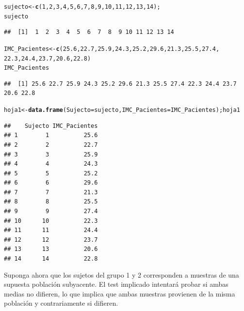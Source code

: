 \documentclass[12pt,letterpaper]{article}\usepackage[]{graphicx}\usepackage[]{color}
\makeatletter
\newcommand{\hlnum}[1]{\textcolor[rgb]{0.686,0.059,0.569}{#1}}%
\newcommand{\hlstd}[1]{\textcolor[rgb]{0.345,0.345,0.345}{#1}}%
\newcommand{\hlkwb}[1]{\textcolor[rgb]{0.69,0.353,0.396}{#1}}%
\newcommand{\hlkwc}[1]{\textcolor[rgb]{0.333,0.667,0.333}{#1}}%
\newcommand{\hlkwd}[1]{\textcolor[rgb]{0.737,0.353,0.396}{\textbf{#1}}}%
\newenvironment{kframe}{%
 \def\at@end@of@kframe{}%
 \ifinner\ifhmode%
  \def\at@end@of@kframe{\end{minipage}}%
  \begin{minipage}{\columnwidth}%
 \fi\fi%
 \def\FrameCommand##1{\hskip\@totalleftmargin \hskip-\fboxsep
 \colorbox{shadecolor}{##1}\hskip-\fboxsep
     \hskip-\linewidth \hskip-\@totalleftmargin \hskip\columnwidth}%
 \MakeFramed {\advance\hsize-\width
   \@totalleftmargin\z@ \linewidth\hsize
   \@setminipage}}%
 {\par\unskip\endMakeFramed%
 \at@end@of@kframe}
\newenvironment{knitrout}{}{} %
\makeatother
\begin{document}
\begin{knitrout}
\color{fgcolor}\begin{kframe}
\begin{alltt}
\hlstd{sujecto} \hlkwb{<-} \hlkwd{c}\hlstd{(}\hlnum{1}\hlstd{,} \hlnum{2}\hlstd{,} \hlnum{3}\hlstd{,} \hlnum{4}\hlstd{,} \hlnum{5}\hlstd{,} \hlnum{6}\hlstd{,} \hlnum{7}\hlstd{,} \hlnum{8}\hlstd{,} \hlnum{9}\hlstd{,} \hlnum{10}\hlstd{,} \hlnum{11}\hlstd{,} \hlnum{12}\hlstd{,} \hlnum{13}\hlstd{,} \hlnum{14}\hlstd{);}
\hlstd{sujecto}
\end{alltt}
\begin{verbatim}
##  [1]  1  2  3  4  5  6  7  8  9 10 11 12 13 14
\end{verbatim}
\begin{alltt}
\hlstd{IMC_Pacientes} \hlkwb{<-} \hlkwd{c}\hlstd{(}\hlnum{25.6}\hlstd{,} \hlnum{22.7}\hlstd{,} \hlnum{25.9}\hlstd{,} \hlnum{24.3}\hlstd{,} \hlnum{25.2}\hlstd{,} \hlnum{29.6}\hlstd{,} \hlnum{21.3}\hlstd{,} \hlnum{25.5}\hlstd{,} \hlnum{27.4}\hlstd{,}
                   \hlnum{22.3}\hlstd{,} \hlnum{24.4}\hlstd{,} \hlnum{23.7}\hlstd{,} \hlnum{20.6}\hlstd{,} \hlnum{22.8}\hlstd{)}
\hlstd{IMC_Pacientes}
\end{alltt}
\begin{verbatim}
##  [1] 25.6 22.7 25.9 24.3 25.2 29.6 21.3 25.5 27.4 22.3 24.4 23.7 20.6 22.8
\end{verbatim}
\begin{alltt}
\hlstd{hoja1} \hlkwb{<-} \hlkwd{data.frame}\hlstd{(}\hlkwc{Sujecto}\hlstd{=sujecto,} \hlkwc{IMC_Pacientes}\hlstd{=IMC_Pacientes); hoja1}
\end{alltt}
\begin{verbatim}
##    Sujecto IMC_Pacientes
## 1        1          25.6
## 2        2          22.7
## 3        3          25.9
## 4        4          24.3
## 5        5          25.2
## 6        6          29.6
## 7        7          21.3
## 8        8          25.5
## 9        9          27.4
## 10      10          22.3
## 11      11          24.4
## 12      12          23.7
## 13      13          20.6
## 14      14          22.8
\end{verbatim}
\end{kframe}
\end{knitrout}

Suponga ahora que los sujetos del grupo 1 y 2 corresponden a muestras de una supuesta poblaci\'on subyacente. El test implicado intentar\'a probar si ambas medias no difieren, lo que implica que ambas muestras provienen de la misma poblaci\'on y contrariamente si difieren.\\
\end{document}
